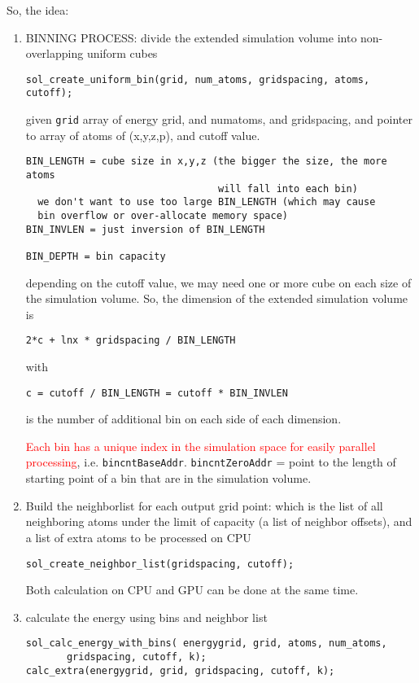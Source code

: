 So, the idea: 
\begin{enumerate}
\item BINNING PROCESS: divide the extended simulation volume into
  non-overlapping uniform cubes
\begin{verbatim}
sol_create_uniform_bin(grid, num_atoms, gridspacing, atoms, cutoff);
\end{verbatim}
  given \verb!grid! array of energy grid, and numatoms, and
  gridspacing, and pointer to array of atoms of (x,y,z,p), and cutoff value.

\begin{verbatim}
BIN_LENGTH = cube size in x,y,z (the bigger the size, the more atoms
                                 will fall into each bin)
  we don't want to use too large BIN_LENGTH (which may cause 
  bin overflow or over-allocate memory space)
BIN_INVLEN = just inversion of BIN_LENGTH

BIN_DEPTH = bin capacity
\end{verbatim}
depending on the cutoff value, we may need one or more cube on each
size of the simulation volume. So, the dimension of the extended
simulation volume is
\begin{verbatim}
2*c + lnx * gridspacing / BIN_LENGTH
\end{verbatim}
with 
\begin{verbatim}
c = cutoff / BIN_LENGTH = cutoff * BIN_INVLEN
\end{verbatim}
is the number of additional bin on each side of each dimension. 

\textcolor{red}{Each bin has a unique index in the simulation space
  for easily parallel processing}, i.e.  \verb!bincntBaseAddr!.
  \verb!bincntZeroAddr! = point to the length of starting point of a
  bin that are in the simulation volume.


\item Build the neighborlist for each output grid point: which is the
  list of all neighboring atoms under the limit of capacity (a list of
  neighbor offsets), and a list of extra atoms to be processed on CPU
\begin{verbatim}
sol_create_neighbor_list(gridspacing, cutoff);
\end{verbatim}

Both calculation on CPU and GPU can be done at the same time.

\item calculate the energy using bins and neighbor list
\begin{verbatim}
sol_calc_energy_with_bins( energygrid, grid, atoms, num_atoms, 
       gridspacing, cutoff, k); 
calc_extra(energygrid, grid, gridspacing, cutoff, k);
\end{verbatim}


\end{enumerate}
